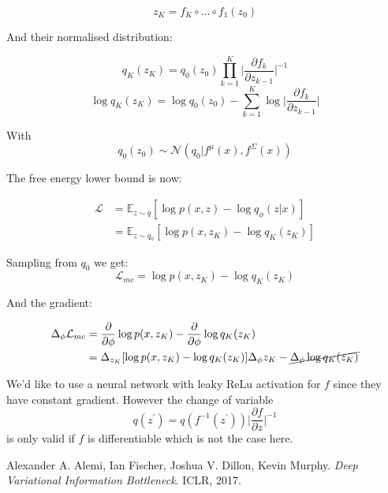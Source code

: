 \documentclass[a4paper]{article}
\begin{document}
$$ z_K = f_K \circ ... \circ f_1(z_0)$$

And their normalised distribution:

$$ q_K(z_K) = q_0(z_0) \prod_{k=1}^K \lvert \frac{\partial f_k}{\partial z_{k-1}} \rvert^{-1}$$
$$\log  q_K(z_K) = \log q_0(z_0) -  \sum_{k=1}^K \log \lvert \frac{\partial f_k}{\partial z_{k-1}} \rvert$$

With
$$ q_0(z_0) \sim \mathcal{N}(q_0 | f^\mu(x), f^\Sigma(x))$$

The free energy lower bound is now:

\begin{align}
\mathcal{L} &= \mathbb{E}_{z \sim q}[\log p(x, z) - \log q_\phi(z|x)] \\
&=  \mathbb{E}_{z \sim q_0}[\log p(x, z_K) - \log q_K(z_K)] 
\end{align}

Sampling from $q_0$ we get:
$$ \mathcal{L}_{mc} = \log p(x, z_K) - \log q_K(z_K) $$

And the gradient:

\begin{align}
\Delta_\phi \mathcal{L}_{mc} &= \frac{\partial}{\partial \phi} \log p(x, z_K) - \frac{\partial}{\partial \phi}  \log q_K(z_K) \\
&= \Delta_{z_K}[\log p(x, z_K) - \log q_K(z_K)] \Delta_\phi z_K - \cancel{\Delta_\phi \log q_K(z_K)}
\end{align}

We'd like to use a neural network with leaky ReLu activation for $f$ since they have constant gradient. However the change of variable 
$$q(z^\prime) = q(f^{-1}(z^\prime)) \lvert \frac{\partial f}{\partial z} \rvert^{-1} $$ is only valid if $f$ is differentiable which is not the case here.

 \begin{thebibliography}{9}
Alexander A. Alemi, Ian Fischer, Joshua V. Dillon, Kevin Murphy. 
\textit{Deep Variational Information Bottleneck}. 
ICLR, 2017.
\end{thebibliography}

 
\end{document}
